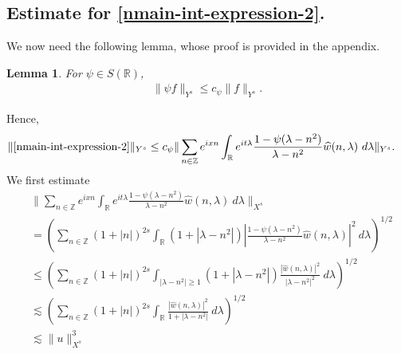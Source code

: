 \documentclass[12pt,reqno]{amsart}
\numberwithin{equation}{section}  %
\newcommand{\rr}{\mathbb{R}}
\newcommand{\zz}{\mathbb{Z}}
\newcommand{\wh}{\widehat}
\newtheorem{lemma}[theorem]{Lemma}
\begin{document}
\subsection{Estimate for \eqref{nmain-int-expression-2}.}
We now need the following lemma, whose proof is provided in the appendix.
%
%
%
%
%
%
%
%
\begin{lemma}
\label{nlem:schwartz-mult}
	For $\psi \in S(\rr)$,
%
%
\begin{equation}
	\label{nschwartz-mult}
	\begin{split}
		\|\psi f \|_{Y^s} \le c_{\psi} \|f \|_{Y^s}.
	\end{split}
\end{equation}
%
%
\end{lemma}
%
%
Hence,
%
%
\begin{equation}
  \label{nyu}
	\begin{split}
		\|\eqref{nmain-int-expression-2}\|_{Y^s} 
    & \le c_{\psi}
		\| \sum_{n \in \zz} e^{ixn} \int_\rr 
		e^{it \lambda} \frac{ 1 - \psi (\lambda - n^{2} ) 
		}{\lambda - n^{2}} \wh{w}(n, \lambda) \ 
		d \lambda\|_{Y^s}.
			\end{split}
\end{equation}
%
We first estimate
%
%
\begin{equation}
\label{nmain-int2-est-X-s-part}
\begin{split}
  & \| \sum_{n \in \zz} e^{ixn} \int_\rr 
		e^{it \lambda} \frac{ 1 - \psi (\lambda - n^{2} ) 
		}{\lambda - n^{2}} \wh{w}(n, \lambda) \ 
		d \lambda\|_{X^s}
		\\
    & = \left( \sum_{n \in \zz} \left (1 + |n| \right )^{2s} \int_\rr
		(1 + |\lambda - n^{2}|) \left | \frac{1 - \psi(\lambda - n^{2 
		})}{\lambda - n^{2}} 
		\wh{w}(n, \lambda) \right |^2 \ d 
		\lambda \right)^{1/2}
		\\
		& \le \left( \sum_{n \in \zz} \left (1 + |n| \right )^{2s} \int_{| \lambda - n^{2}| \ge 1}
		(1 + |\lambda - n^{2}|) \frac{|\wh{w}(n, \lambda)|^2 }{|\lambda - n^{2}|^2} 
		\ d 
		\lambda \right)^{1/2}
		\\
		& \lesssim  \left( \sum_{n \in 
		\zz} \left (1 + |n| \right )^{2s} \int_\rr
		\frac{|\wh{w}(n, \lambda) |^2}{1+ |\lambda - 
		n^{2}|} 
		 \ d \lambda 
		\right)^{1/2}
		\\
		& \lesssim  \|u\|_{X^s}^3
\end{split}
\end{equation}
\end{document}
